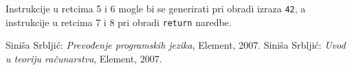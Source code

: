 \documentclass[times, 12pt, utf8]{book}
\begin{document}
Instrukcije u retcima 5 i 6 mogle bi se generirati pri obradi izraza \verb|42|, a instrukcije u retcima 7 i 8 pri obradi \verb|return| naredbe.


\newpage
{}
\begin{thebibliography}{10}
Siniša Srbljić:
\emph{Prevođenje programskih jezika}, Element, 2007.
Siniša Srbljić:
\emph{Uvod u teoriju računarstva}, Element, 2007.
\end{thebibliography}
\end{document}
